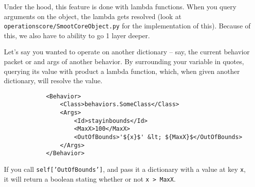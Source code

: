 \documentclass{article}
\begin{document}
        Under the hood, this feature is done with lambda functions.  When you query arguments on the
        object, the lambda gets resolved (look at \texttt{operationscore/SmootCoreObject.py} for the
        implementation of this).  Because of this, we also have to ability to go 1 layer deeper.  

        Let's say you wanted to operate on another dictionary -- say, the current behavior packet or
        and args of another behavior.  By surrounding your variable in quotes, querying its value
        with product a lambda function, which, when given another dictionary, will resolve the
        value.
        \begin{verbatim}
            <Behavior>
                <Class>behaviors.SomeClass</Class>
                <Args>
                    <Id>stayinbounds</Id>
                    <MaxX>100</MaxX>
                    <OutOfBounds>'${x}$' &lt; ${MaxX}$</OutOfBounds>
                </Args>
            </Behavior>
        \end{verbatim}
        If you call \texttt{self['OutOfBounds']}, and pass it a dictionary with a value at key
        \texttt{x}, it will return a boolean stating whether or not \texttt{x > MaxX}. 
\end{document}
